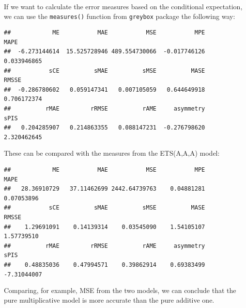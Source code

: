 \documentclass[
]{book}
\newenvironment{Shaded}{\begin{snugshade}}{\end{snugshade}}
\newcommand{\FunctionTok}[1]{\textcolor[rgb]{0.00,0.00,0.00}{#1}}
\newcommand{\NormalTok}[1]{#1}
\newcommand{\SpecialCharTok}[1]{\textcolor[rgb]{0.00,0.00,0.00}{#1}}
\theoremstyle{definition}
\theoremstyle{definition}
\theoremstyle{definition}
\theoremstyle{definition}
\theoremstyle{remark}
\begin{document}
If we want to calculate the error measures based on the conditional expectation, we can use the \texttt{measures()} function from \texttt{greybox} package the following way:

\begin{Shaded}
\end{Shaded}

\begin{verbatim}
##            ME           MAE           MSE           MPE          MAPE 
##  -6.273144614  15.525728946 489.554730066  -0.017746126   0.033946865 
##           sCE          sMAE          sMSE          MASE         RMSSE 
##  -0.286780602   0.059147341   0.007105059   0.644649918   0.706172374 
##          rMAE         rRMSE          rAME     asymmetry          sPIS 
##   0.204285907   0.214863355   0.088147231  -0.276798620   2.320462645
\end{verbatim}

These can be compared with the measures from the ETS(A,A,A) model:

\begin{Shaded}
\end{Shaded}

\begin{verbatim}
##            ME           MAE           MSE           MPE          MAPE 
##   28.36910729   37.11462699 2442.64739763    0.04881281    0.07053896 
##           sCE          sMAE          sMSE          MASE         RMSSE 
##    1.29691091    0.14139314    0.03545090    1.54105107    1.57739510 
##          rMAE         rRMSE          rAME     asymmetry          sPIS 
##    0.48835036    0.47994571    0.39862914    0.69383499   -7.31044007
\end{verbatim}

Comparing, for example, MSE from the two models, we can conclude that the pure multiplicative model is more accurate than the pure additive one.
\end{document}
